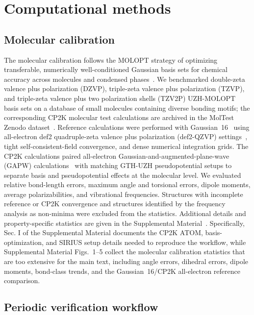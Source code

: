 \documentclass[aps,prb,reprint,amsmath,amssymb,superscriptaddress,longbibliography,floatfix]{revtex4-2}
\begin{document}
\section{Computational methods}

\subsection{Molecular calibration}

The molecular calibration follows the MOLOPT strategy of optimizing transferable, numerically well-conditioned Gaussian basis sets for chemical accuracy across molecules and condensed phases~\cite{VandeVondele2007}. We benchmarked double-zeta valence plus polarization (DZVP), triple-zeta valence plus polarization (TZVP), and triple-zeta valence plus two polarization shells (TZV2P) UZH-MOLOPT basis sets on a database of small molecules containing diverse bonding motifs; the corresponding CP2K molecular test calculations are archived in the MolTest Zenodo dataset~\cite{HutterMuller2023MolTest}. Reference calculations were performed with Gaussian~16~\cite{Gaussian16} using all-electron def2 quadruple-zeta valence plus polarization (def2-QZVP) settings~\cite{Weigend2005}, tight self-consistent-field convergence, and dense numerical integration grids. The CP2K calculations paired all-electron Gaussian-and-augmented-plane-wave (GAPW) calculations~\cite{Lippert1999GAPW} with matching GTH-UZH pseudopotential setups to separate basis and pseudopotential effects at the molecular level. We evaluated relative bond-length errors, maximum angle and torsional errors, dipole moments, average polarizabilities, and vibrational frequencies. Structures with incomplete reference or CP2K convergence and structures identified by the frequency analysis as non-minima were excluded from the statistics. Additional details and property-specific statistics are given in the Supplemental Material~\cite{SuppMat}. Specifically, Sec. I of the Supplemental Material documents the CP2K ATOM, basis-optimization, and SIRIUS setup details needed to reproduce the workflow, while Supplemental Material Figs.~1--5 collect the molecular calibration statistics that are too extensive for the main text, including angle errors, dihedral errors, dipole moments, bond-class trends, and the Gaussian~16/CP2K all-electron reference comparison.

\subsection{Periodic verification workflow}
\end{document}
